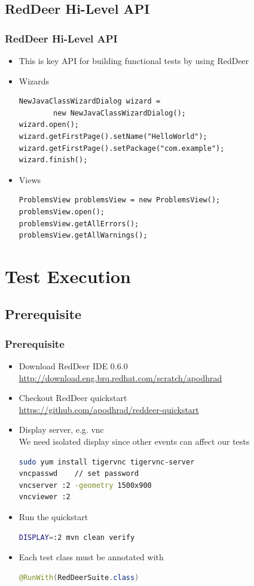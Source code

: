 \documentclass{beamer}
\begin{document}
\subsection{RedDeer Hi-Level API}
\begin{frame}[fragile]
\frametitle{RedDeer Hi-Level API}
\begin{itemize}
\item This is key API for building functional tests by using RedDeer
\item Wizards
\begin{lstlisting}
NewJavaClassWizardDialog wizard =
        new NewJavaClassWizardDialog();
wizard.open();
wizard.getFirstPage().setName("HelloWorld");
wizard.getFirstPage().setPackage("com.example");
wizard.finish();
\end{lstlisting}
\item Views
\begin{lstlisting}
ProblemsView problemsView = new ProblemsView();
problemsView.open();
problemsView.getAllErrors();
problemsView.getAllWarnings();
\end{lstlisting}
\end{itemize}
\end{frame}


\section{Test Execution}

\subsection{Prerequisite}
\begin{frame}[fragile]
\frametitle{Prerequisite}
\begin{itemize}
\item Download RedDeer IDE 0.6.0\\\url{http://download.eng.brq.redhat.com/scratch/apodhrad}
\item Checkout RedDeer quickstart\\\url{https://github.com/apodhrad/reddeer-quickstart}
\item Display server, e.g. vnc\\We need isolated display since other events can affect our tests
\begin{lstlisting}[language=sh]
sudo yum install tigervnc tigervnc-server
vncpasswd    // set password
vncserver :2 -geometry 1500x900
vncviewer :2
\end{lstlisting}
\item Run the quickstart
\begin{lstlisting}[language=sh]
DISPLAY=:2 mvn clean verify
\end{lstlisting}
\item Each test class must be annotated with
\begin{lstlisting}[language=Java]
@RunWith(RedDeerSuite.class)
\end{lstlisting}
\end{itemize}
\end{frame}
\end{document}
